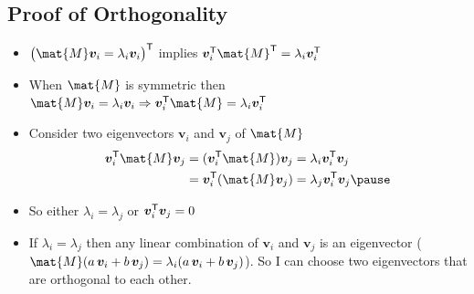 
\begin{slide}
\section[-2]{Proof of Orthogonality}

\begin{PauseHighLight}
  \begin{itemize}
  \item $\left(\strut \mat{M}\bm{v}_i = \lambda_i\bm{v}_i\right)^\tr$
    implies $\bm{v}_i^\tr \mat{M}^\tr = \lambda_i\bm{v}_i^\tr$\pause
  \item When $\mat{M}$ is symmetric then $\mat{M}\bm{v}_i = \lambda_i\bm{v}_i
    \Rightarrow \bm{v}_i^\tr \mat{M} = \lambda_i\bm{v}_i^\tr$\pause
  \item Consider two eigenvectors $\bm{v}_i$ and $\bm{v}_j$ of $\mat{M}$
    \begin{align*}
      \bm{v}_i^\tr \mat{M} \bm{v}_j &= (\bm{v}_i^\tr \mat{M}) \bm{v}_j =
      \lambda_i  \bm{v}_i^\tr \bm{v}_j \\
      &= \bm{v}_i^\tr (\mat{M} \bm{v}_j)
      = \lambda_j  \bm{v}_i^\tr \bm{v}_j\pause
    \end{align*}
  \item So either $\lambda_i = \lambda_j$ or $\bm{v}_i^{\textsf{T}} \bm{v}_j=0$\pause
  \item If $\lambda_i = \lambda_j$ then any linear combination of
    $\bm{v}_i$ and $\bm{v}_j$ is an eigenvector
    ($\mat{M} (a\,\bm{v}_i + b\,\bm{v}_j) = \lambda_i (a\,\bm{v}_i +
    b\,\bm{v}_j) $)\pause.  So I can choose two eigenvectors that are
    orthogonal to each other.\pauseb
  \end{itemize}
\end{PauseHighLight}

\end{slide}

\Outline %

